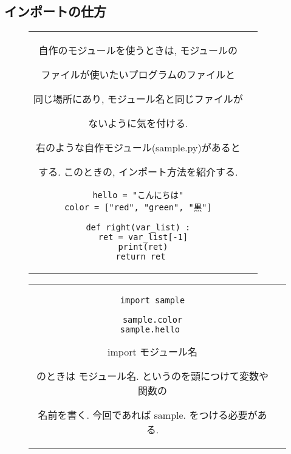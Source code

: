 \documentclass{jsarticle}
\begin{document}
\newpage
\subsection{インポートの仕方}
\begin{figure}[h]
	\begin{tabular}{cc}
		\begin{minipage}[t]{.45\textwidth}
			自作のモジュールを使うときは, モジュールの\par
			ファイルが使いたいプログラムのファイルと \par
			同じ場所にあり,  モジュール名と同じファイルが\par ないように気を付ける.  \par
			右のような自作モジュール(sample.py)があると \par する.
			このときの, インポート方法を紹介する.
		\end{minipage} \hspace{15mm}
		\begin{minipage}[t]{.4\textwidth}
			\vspace{-10mm}
			\begin{lstlisting}[caption=sample.py]
hello = "こんにちは"
color = ["red", "green", "黒"]

def right(var_list) :
  ret = var_list[-1]
  print(ret)
  return ret \end{lstlisting}
		\end{minipage}
	\end{tabular}
\end{figure}


\begin{figure}[h]
	\begin{tabular}{cc}
		\begin{minipage}[t]{.4\textwidth}
			\begin{lstlisting}[caption=インポートの仕方-その1]
import sample

sample.color
sample.hello \end{lstlisting}
		\end{minipage} \hspace{5mm}
		\begin{minipage}[t]{.6\textwidth}
			\begin{screen}
				import モジュール名 \par
				のときは モジュール名. というのを頭につけて変数や関数の \par 名前を書く.
				今回であれば sample. をつける必要がある.
			\end{screen}
		\end{minipage}
	\end{tabular}
\end{figure}
\end{document}
